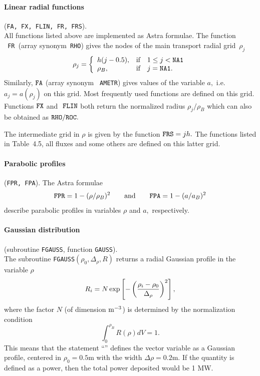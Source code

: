 \paragraph{Linear radial functions} ({\tt FA, FX, FLIN, FR, FRS}).\\
All functions listed above are implemented as Astra formulae. 
The function {\tt~FR~}(array synonym{\tt~RHO}) gives the nodes of the
main transport radial grid~$\rho_j$ 
$$
\rho_j=
\left\{\begin{array}{ll}
h(j-0.5)
, &
\mbox{if}\quad 1 \leq j < {\tt NA1}\\
\rho_B
,\quad &
\mbox{if}\quad j = {\tt NA1}
.\\
\end{array}\right.
$$
Similarly, ${\tt FA}$ (array synonym {\tt~AMETR}) gives values of
the variable $a,$ i.e. $a_j=a(\rho_j)$ on this grid.
Most frequently used functions are defined on this grid.
Functions ${\tt FX}$ and ${\tt~FLIN}$ both return the normalized
radius $\rho_j/\rho_B$ which can also be obtained as
${\tt RHO/ROC}.$ 

The intermediate grid in $\rho$ is given by the function
${\tt FRS}=jh.$
The functions listed in Table~4.5, all fluxes and some others are
defined on this latter grid.  

\paragraph{Parabolic profiles} ({\tt FPR, FPA}).
The Astra formulae
$${\tt FPR}=1-(\rho/\rho_B)^2
\qquad{\rm and}\qquad
{\tt FPA}=1-(a/a_B)^2
$$ 
describe parabolic profiles in variables $\rho$ and $a,$ respectively.

\paragraph{Gaussian distribution} 
(subroutine {\tt FGAUSS}, function {\tt GAUSS}). \\
The subroutine {\tt FGAUSS}$(\rho_0,\Delta_\rho,R)$ returns a radial
Gaussian profile in the variable $\rho$
$$
R_i=N\exp\left[-\left(\frac{\rho_i-\rho_0}{\Delta_\rho}\right)^2\right]
,$$
where the factor $N$ (of dimension ${\rm m}^{-3}$) is determined by the
normalization condition 
$$
\int_0^{\rho_B} R(\rho)dV=1
.$$
This means that the statement 
``''
defines the vector variable  as a Gaussian profile, centered in
$\rho_0=0.5$m with the width $\Delta\rho=0.2$m.
If the quantity  is defined as a power, then the total power
deposited would be 1 MW.

